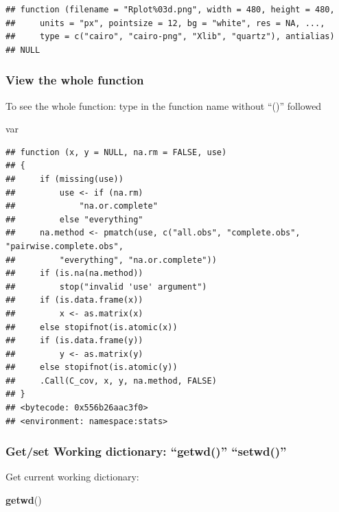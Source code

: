 \documentclass[]{article}
\newenvironment{Shaded}{\begin{snugshade}}{\end{snugshade}}
\newcommand{\KeywordTok}[1]{\textcolor[rgb]{0.13,0.29,0.53}{\textbf{#1}}}
\newcommand{\NormalTok}[1]{#1}
\begin{document}
\begin{verbatim}
## function (filename = "Rplot%03d.png", width = 480, height = 480, 
##     units = "px", pointsize = 12, bg = "white", res = NA, ..., 
##     type = c("cairo", "cairo-png", "Xlib", "quartz"), antialias) 
## NULL
\end{verbatim}

\hypertarget{view-the-whole-function}{%
\subsubsection{View the whole function}\label{view-the-whole-function}}

To see the whole function: type in the function name without ``()''
followed

\begin{Shaded}
\begin{Highlighting}[]
\NormalTok{var}
\end{Highlighting}
\end{Shaded}

\begin{verbatim}
## function (x, y = NULL, na.rm = FALSE, use) 
## {
##     if (missing(use)) 
##         use <- if (na.rm) 
##             "na.or.complete"
##         else "everything"
##     na.method <- pmatch(use, c("all.obs", "complete.obs", "pairwise.complete.obs", 
##         "everything", "na.or.complete"))
##     if (is.na(na.method)) 
##         stop("invalid 'use' argument")
##     if (is.data.frame(x)) 
##         x <- as.matrix(x)
##     else stopifnot(is.atomic(x))
##     if (is.data.frame(y)) 
##         y <- as.matrix(y)
##     else stopifnot(is.atomic(y))
##     .Call(C_cov, x, y, na.method, FALSE)
## }
## <bytecode: 0x556b26aac3f0>
## <environment: namespace:stats>
\end{verbatim}

\hypertarget{getset-working-dictionary-getwd-setwd}{%
\subsubsection{Get/set Working dictionary: ``getwd()''
``setwd()''}\label{getset-working-dictionary-getwd-setwd}}

Get current working dictionary:

\begin{Shaded}
\begin{Highlighting}[]
\KeywordTok{getwd}\NormalTok{()}
\end{Highlighting}
\end{Shaded}
\end{document}
